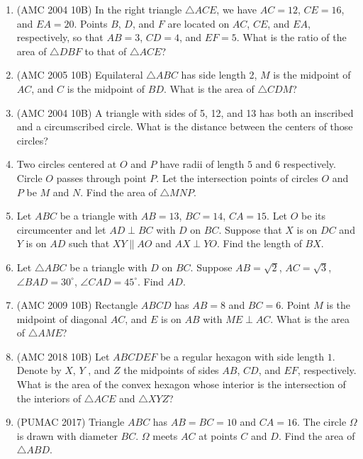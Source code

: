 \documentclass[11pt]{scrartcl}
\begin{document}
\begin{enumerate}
    \item (AMC 2004 10B) In the right triangle $\triangle ACE$, we have $AC = 12$, $CE = 16$, and $EA = 20$. Points $B$, $D$, and $F$ are located on $AC$, $CE$, and $EA$, respectively, so that $AB = 3$, $CD = 4$, and $EF = 5$. What is the ratio of the area of $\triangle DBF$ to that of $\triangle ACE$?

    \item (AMC 2005 10B) Equilateral $\triangle ABC$ has side length 2, $M$ is the midpoint of $AC$, and $C$ is the midpoint of $BD$. What is the area of $\triangle CDM$?

    \item (AMC 2004 10B) A triangle with sides of 5, 12, and 13 has both an inscribed and a circumscribed circle. What is the distance between the centers of those circles?

    \item Two circles centered at $O$ and $P$ have radii of length $5$ and $6$ respectively. Circle $O$ passes through point $P$. Let the intersection points of circles $O$ and $P$ be $M$ and $N$. Find the area of $\triangle MNP$.

    \item Let $ABC$ be a triangle with $AB = 13$, $BC = 14$, $CA = 15$. Let $O$ be its circumcenter and let $AD \perp BC$ with $D$ on $BC$. Suppose that $X$ is on $DC$ and $Y$ is on $AD$ such that $XY \parallel AO$ and $AX \perp YO$. Find the length of $BX$.

    \item Let $\triangle ABC$ be a triangle with $D$ on $BC$. Suppose $AB = \sqrt{2}$, $AC = \sqrt{3}$, $\angle BAD = 30^\circ$, $\angle CAD = 45^\circ$. Find $AD$.

    \item (AMC 2009 10B) Rectangle $ABCD$ has $AB = 8$ and $BC = 6$. Point $M$ is the midpoint of diagonal $AC$, and $E$ is on $AB$ with $ME \perp AC$. What is the area of $\triangle AME$?


    \item (AMC 2018 10B) Let $ABCDEF$ be a regular hexagon with side length $1$. Denote by $X$, $Y$ , and $Z$ the midpoints of sides $AB$, $CD$, and $EF$, respectively. What is the area of the convex hexagon whose interior is the intersection of the interiors of $\triangle ACE$ and $\triangle XYZ$?


    \item (PUMAC 2017) Triangle $ABC$ has $AB = BC = 10$ and $CA = 16$. The circle $\Omega$ is drawn with diameter $BC$. $\Omega$ meets $AC$ at points $C$ and $D$. Find the area of $\triangle ABD$.



\end{enumerate}
\end{document}
